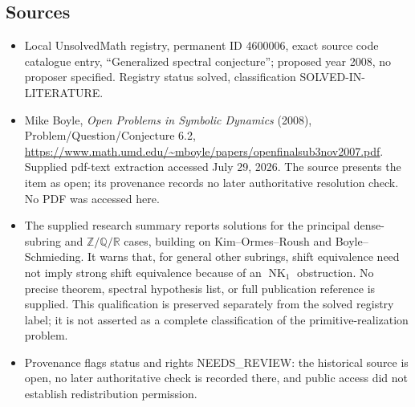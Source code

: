 \documentclass[11pt]{article}
\newcommand{\Z}{\mathbb{Z}}
\newcommand{\Q}{\mathbb{Q}}
\newcommand{\R}{\mathbb{R}}
\begin{document}
\subsection{Sources}
\begin{itemize}
\item Local UnsolvedMath registry, permanent ID 4600006, exact source code catalogue entry, ``Generalized spectral conjecture''; proposed year 2008, no proposer specified. Registry status solved, classification SOLVED-IN-LITERATURE.
\item Mike Boyle, \emph{Open Problems in Symbolic Dynamics} (2008), Problem/Question/Conjecture 6.2, \url{https://www.math.umd.edu/~mboyle/papers/openfinalsub3nov2007.pdf}. Supplied pdf-text extraction accessed July 29, 2026. The source presents the item as open; its provenance records no later authoritative resolution check. No PDF was accessed here.
\item The supplied research summary reports solutions for the principal dense-subring and $\Z/\Q/\R$ cases, building on Kim--Ormes--Roush and Boyle--Schmieding. It warns that, for general other subrings, shift equivalence need not imply strong shift equivalence because of an $\operatorname{NK}_1$ obstruction. No precise theorem, spectral hypothesis list, or full publication reference is supplied. This qualification is preserved separately from the solved registry label; it is not asserted as a complete classification of the primitive-realization problem.
\item Provenance flags status and rights NEEDS\_REVIEW: the historical source is open, no later authoritative check is recorded there, and public access did not establish redistribution permission.
\end{itemize}
\end{document}
